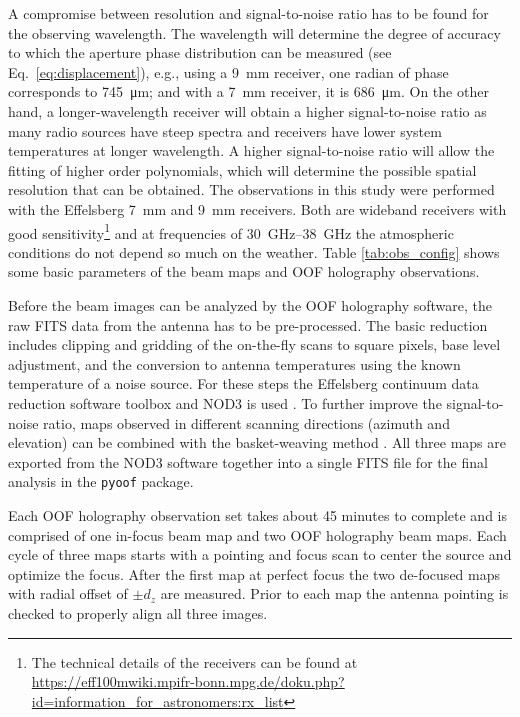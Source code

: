 \documentclass[
    ]
    {aa}
\begin{document}
    A compromise between resolution and signal-to-noise ratio has to be found for the observing wavelength. The wavelength will determine the degree of accuracy to which the aperture phase distribution can be measured (see Eq.~\ref{eq:displacement}), e.g., using a \SI{9}{\mm} receiver, one radian of phase corresponds to \SI{745}{\micro\metre}; and with a \SI{7}{\mm} receiver, it is \SI{686}{\micro\metre}. On the other hand, a longer-wavelength receiver will obtain a higher signal-to-noise ratio as many radio sources have steep spectra and receivers have lower system temperatures at longer wavelength. A higher signal-to-noise ratio will allow the fitting of higher order polynomials, which will determine the possible spatial resolution that can be obtained.
    The observations in this study were performed with the Effelsberg \SI{7}{\mm} and \SI{9}{\mm} receivers. Both are wideband receivers with good sensitivity\footnote{The technical details of the receivers can be found at \url{https://eff100mwiki.mpifr-bonn.mpg.de/doku.php?id=information_for_astronomers:rx_list}} and at frequencies of \SIrange{30}{38}{\GHz} the atmospheric conditions do not depend so much on the weather. Table \ref{tab:obs_config} shows some basic parameters of the beam maps and OOF holography observations.

    Before the beam images can be analyzed by the OOF holography software, the raw FITS data from the antenna has to be pre-processed. The basic reduction includes clipping and gridding of the on-the-fly scans to square pixels, base level adjustment, and the conversion to antenna temperatures using the known temperature of a noise source. For these steps the Effelsberg continuum data reduction software toolbox and NOD3 is used \citep{2017A&A...606A..41M}. To further improve the signal-to-noise ratio, maps observed in different scanning directions (azimuth and elevation) can be combined with the basket-weaving method \citep{1988A&A...190..353E}. All three maps are exported from the NOD3 software together into a single FITS file for the final analysis in the \texttt{pyoof} package.

    Each OOF holography observation set takes about 45 minutes to complete and is comprised of one in-focus beam map and two OOF holography beam maps. Each cycle of three maps starts with a pointing and focus scan to center the source and optimize the focus. After the first map at perfect focus the two de-focused maps with radial offset of $\pm d_z$ are measured. Prior to each map the antenna pointing is checked to properly align all three images.
    
\end{document}
